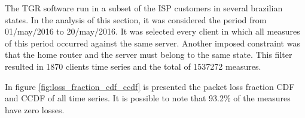 The TGR software run in a subset of the ISP customers in several brazilian states. In the analysis of this section, it was considered the period from 01/may/2016 to 20/may/2016. It was selected every client in which all measures of this period occurred against the same server. Another imposed constraint was that the home router and the server must belong to the same state. This filter resulted in 1870 clients time series and the total of 1537272 measures.

In figure \ref{fig:loss_fraction_cdf_ccdf} is presented the packet loss fraction CDF and CCDF of all time series. It is possible to note that 93.2\% of the measures have zero losses.

\begin{figure}[H]
\end{figure}

